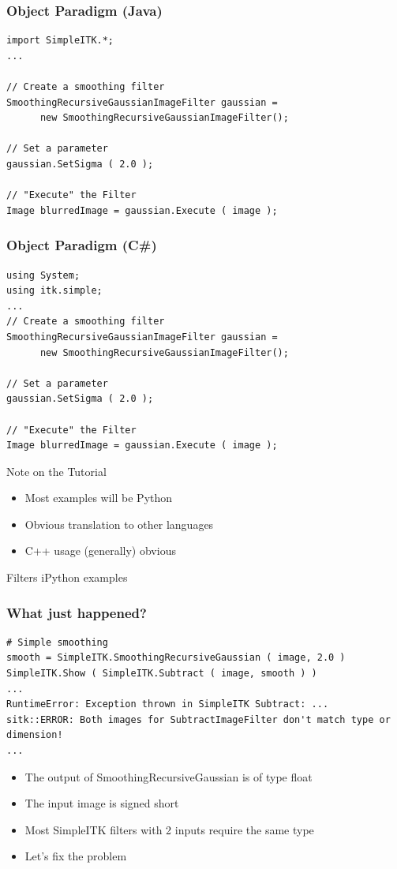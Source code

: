 \begin{frame}[fragile]
\frametitle{Object Paradigm (Java)}
\lstjava
\begin{lstlisting}
import SimpleITK.*;
...

// Create a smoothing filter
SmoothingRecursiveGaussianImageFilter gaussian =
      new SmoothingRecursiveGaussianImageFilter();

// Set a parameter
gaussian.SetSigma ( 2.0 );

// "Execute" the Filter
Image blurredImage = gaussian.Execute ( image );
\end{lstlisting}
\end{frame}


\begin{frame}[fragile]
\frametitle{Object Paradigm (C\#)}
\lstjava
\begin{lstlisting}
using System;
using itk.simple;
...
// Create a smoothing filter
SmoothingRecursiveGaussianImageFilter gaussian =
      new SmoothingRecursiveGaussianImageFilter();

// Set a parameter
gaussian.SetSigma ( 2.0 );

// "Execute" the Filter
Image blurredImage = gaussian.Execute ( image );
\end{lstlisting}
\end{frame}


\begin{frame}{Note on the Tutorial}
\begin{itemize}
  \item Most examples will be Python
  \item Obvious translation to other languages
  \item C++ usage (generally) obvious
\end{itemize}
\end{frame}


\begin{frame}{Filters}
iPython examples
\end{frame}

\begin{frame}[fragile]
\frametitle{What just happened?}
\lstpython
\begin{lstlisting}
# Simple smoothing
smooth = SimpleITK.SmoothingRecursiveGaussian ( image, 2.0 )
SimpleITK.Show ( SimpleITK.Subtract ( image, smooth ) )
...
RuntimeError: Exception thrown in SimpleITK Subtract: ...
sitk::ERROR: Both images for SubtractImageFilter don't match type or dimension!
...
\end{lstlisting}

\begin{itemize}
  \item The output of SmoothingRecursiveGaussian is of type float
  \item The input image is signed short
  \item Most SimpleITK filters with 2 inputs require the same type
  \item Let's fix the problem
\end{itemize}

\end{frame}

